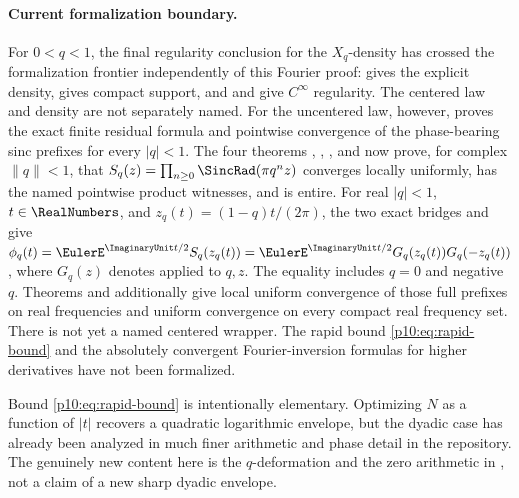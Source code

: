 \documentclass[11pt]{article}
\numberwithin{equation}{section}
\theoremstyle{definition}
\theoremstyle{remark}
\begin{document}
\paragraph{Current formalization boundary.}
For \(0<q<1\), the final regularity conclusion for the \(X_q\)-density has crossed the
formalization frontier independently of this Fourier proof:
 gives the explicit density,
 gives compact support, and
 and
 give \(C^\infty\) regularity.  The centered law and
density are not separately named.  For the uncentered law, however,
 proves the exact finite residual formula and
pointwise convergence of the phase-bearing sinc prefixes for every \(|q|<1\).  The four
theorems ,
,
, and
 now prove, for complex
\(\lVert q\rVert<1\), that
\(S_q(z)=\prod_{n\ge0}\SincRad(\pi q^nz)\) converges locally uniformly, has the named
pointwise product witnesses, and is entire.  For real \(|q|<1\), \(t\in\RealNumbers\), and
\(z_q(t)=(1-q)t/(2\pi)\), the two exact bridges
 and
 give
\(\phi_q(t)=\EulerE^{\ImaginaryUnit t/2}S_q(z_q(t))
=\EulerE^{\ImaginaryUnit t/2}G_q(z_q(t))G_q(-z_q(t))\), where \(G_q(z)\) denotes
 applied to \(q,z\).  The equality includes \(q=0\) and
negative \(q\).
Theorems  and
 additionally give local uniform convergence
of those full prefixes on real frequencies and uniform convergence on every compact real
frequency set.  There is not yet a named centered wrapper.  The rapid bound
\eqref{p10:eq:rapid-bound} and the
absolutely convergent Fourier-inversion formulas for higher derivatives have not been
formalized.

\begin{remark}
Bound \eqref{p10:eq:rapid-bound} is intentionally elementary.  Optimizing $N$ as a function of
$|t|$ recovers a quadratic logarithmic envelope, but the dyadic case has already been
analyzed in much finer arithmetic and phase detail in the repository.  The genuinely new
content here is the $q$-deformation and the zero arithmetic in , not a claim
of a new sharp dyadic envelope.
\end{remark}
\end{document}
